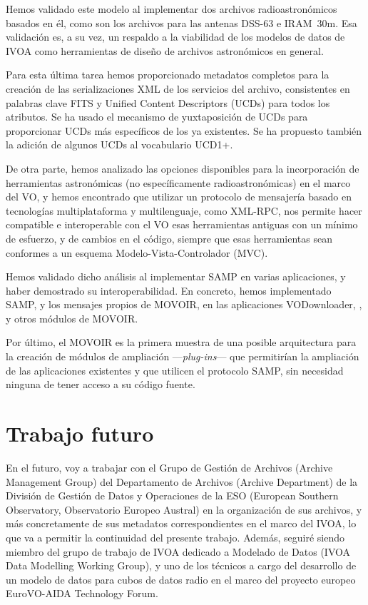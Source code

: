 	Hemos validado este modelo al implementar dos archivos
	radioastronómicos basados en él, como son los archivos para las
	antenas DSS-63 e IRAM~30m. Esa validación es, a su vez,
	un respaldo a la viabilidad de los modelos de datos de
	IVOA como herramientas de diseño de archivos astronómicos
	en general.
	
	Para esta última tarea hemos proporcionado metadatos completos
	para la creación de las serializaciones XML de los servicios
	del archivo, consistentes en palabras clave FITS y Unified
	Content Descriptors (UCDs) para todos los atributos. Se ha
	usado el mecanismo de yuxtaposición de UCDs para proporcionar
	UCDs más específicos de los ya existentes. Se ha propuesto
	también la adición de algunos UCDs al vocabulario UCD1+.
	
	De otra parte, hemos analizado las opciones disponibles para
	la incorporación de herramientas astronómicas (no
	específicamente radioastronómicas) en el marco del VO, y
	hemos encontrado que utilizar un protocolo de mensajería
	basado en tecnologías multiplataforma y multilenguaje, como
	XML-RPC, nos permite hacer compatible e interoperable con el
	VO esas herramientas antiguas con un mínimo de esfuerzo, y 
	de cambios en el código, siempre que esas herramientas sean
	conformes a un esquema Modelo-Vista-Controlador (MVC).
	
	Hemos validado dicho análisis al implementar SAMP en varias
	aplicaciones, y haber demostrado su interoperabilidad. En
	concreto, hemos implementado SAMP, y los mensajes propios
	de MOVOIR, en las aplicaciones VODownloader, \massa{}, y otros
	módulos de MOVOIR.
		
	Por último, el MOVOIR es la primera muestra de una posible
	arquitectura para la creación de módulos de ampliación
	---\emph{plug-ins}--- que permitirían la ampliación de las
	aplicaciones existentes y que utilicen el protocolo SAMP,
	sin necesidad ninguna de tener acceso a su código fuente.
	
	\section*{Trabajo futuro} %
	\label{sec:trabajo_futuro}
		
		En el futuro, voy a trabajar con el Grupo de Gestión de
		Archivos (Archive Management Group) del Departamento de 
		Archivos (Archive Department) de la División de Gestión de
		Datos y Operaciones de la ESO (European Southern
		Observatory, Observatorio Europeo Austral) en la
		organización de sus archivos, y más concretamente de sus
		metadatos correspondientes en el marco del IVOA, lo que va
		a permitir la continuidad del presente trabajo. Además,
		seguiré siendo miembro del grupo de trabajo de IVOA
		dedicado a Modelado de Datos (IVOA Data Modelling Working
		Group), y uno de los técnicos a cargo del desarrollo de un
		modelo de datos para cubos de datos radio en el marco
		del proyecto europeo EuroVO-AIDA Technology Forum.
		
